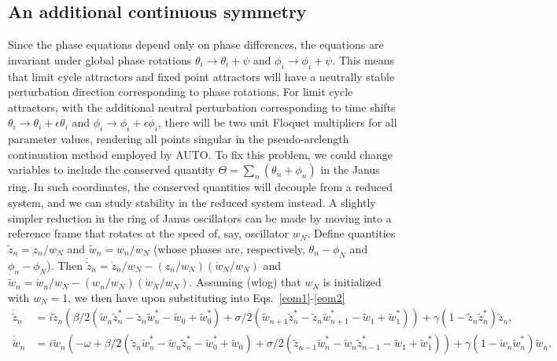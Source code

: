 \documentclass[aps,pre,amsmath,amssymb,floatfix,onecolumn,notitlepage,10pt]{revtex4-1}
\begin{document}
\subsection{An additional continuous symmetry}
Since the phase equations depend only on phase differences, the equations are invariant under global phase rotations $\theta_i\to\theta_i+\psi$ and $\phi_i\to \phi_i+\psi$.  This means that limit cycle attractors and fixed point attractors will have a neutrally stable perturbation direction corresponding to phase rotations. For limit cycle attractors, with the additional neutral perturbation corresponding to time shifts $\theta_i\to\theta_i+\epsilon\dot{\theta_i}$ and $\phi_i\to\phi_i+\epsilon\dot{\phi_i}$, there will be two unit Floquet multipliers for all parameter values, rendering all points singular in the pseudo-arclength continuation method employed by AUTO. To fix this problem, we could change variables to include the conserved quantity $\Theta = \sum_n \left(\theta_n + \phi_n\right)$ in the Janus ring. In such coordinates, the conserved quantities will decouple from a reduced system, and we can study stability in the reduced system instead.  A slightly simpler reduction in the ring of Janus oscillators can be made by moving into a reference frame that rotates at the speed of, say, oscillator $w_N$. Define quantities $\tilde{z}_n = z_n/w_N$ and $\tilde{w}_n = w_n/w_N$ (whose phases are, respectively, $\theta_n-\phi_N$ and $\phi_n-\phi_N$).  Then $\dot {\tilde z}_n = \dot z_n / w_N - \left(z_n/w_N\right)\left( \dot w_N/w_N\right)$ and $\dot {\tilde w}_n = \dot w_n / w_N - \left(w_n/w_N\right) \left(\dot w_N/w_N\right)$. Assuming (wlog) that $w_N$ is initialized with $w_N=1$, we then have upon substituting into Eqs.~\ref{eom1}-\ref{eom2}
\begin{align}
\dot {\tilde z}_n &= i{\tilde z}_n\left(  \beta/2\left({\tilde w}_n{\tilde z}_n^*-{\tilde z}_n{\tilde w}_n^* - {\tilde w}_0+{\tilde w}_0^*\right) + \sigma/2\left({\tilde w}_{n+1}{\tilde z}_n^*-{\tilde z}_n{\tilde w}_{n+1}^* - {\tilde w}_1+{\tilde w}_1^*\right)\right) + \gamma\left(1-{\tilde z}_n{\tilde z}_n^*\right){\tilde z}_n, \label{janus_rot1}\\
\dot {\tilde w}_n &= i{\tilde w}_n\left( -\omega + \beta/2\left({\tilde z}_n{\tilde w}_n^*-{\tilde w}_n{\tilde z}_n^* -{\tilde w}_0^*+{\tilde w}_0 \right) + \sigma/2\left({\tilde z}_{n-1}{\tilde w}_n^*-{\tilde w}_n{\tilde z}_{n-1}^* - {\tilde w}_1+{\tilde w}_1^*\right)\right) + \gamma\left(1-{\tilde w}_n{\tilde w}_n^*\right){\tilde w}_n. \label{janus_rot2}
\end{align}
\end{document}
